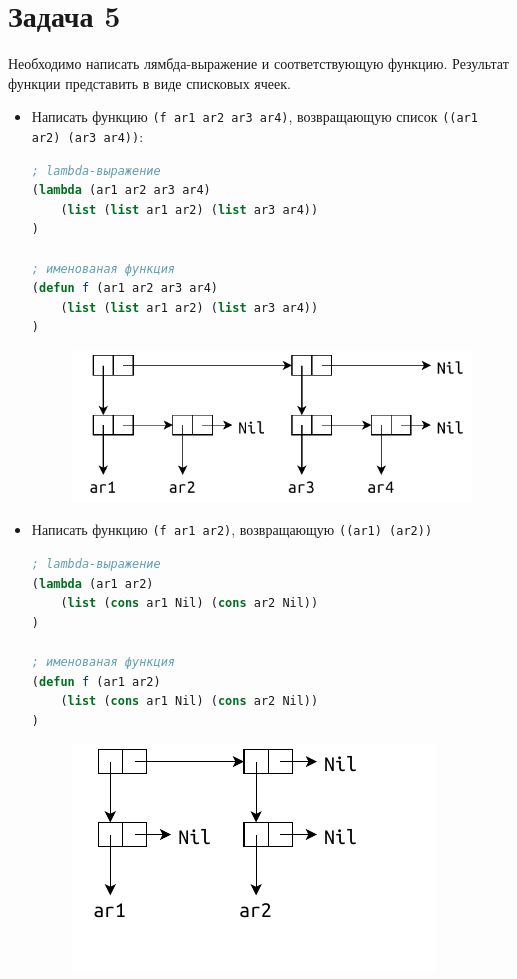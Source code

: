 \section{Задача 5}

Необходимо написать лямбда-выражение и соответствующую функцию. Результат функции представить в виде списковых ячеек.

\begin{itemize}[$\bullet$]
	\item Написать функцию \texttt{(f ar1 ar2 ar3 ar4)}, возвращающую список \texttt{((ar1 ar2) (ar3 ar4))}:
	
\begin{lstlisting}[language=Lisp]
; lambda-выражение
(lambda (ar1 ar2 ar3 ar4)
	(list (list ar1 ar2) (list ar3 ar4))
)

; именованая функция
(defun f (ar1 ar2 ar3 ar4)
	(list (list ar1 ar2) (list ar3 ar4))
)
\end{lstlisting}

	\begin{figure}[ht]
		\centering
		\includegraphics[scale=1]{img/1-7}
	\end{figure}

	\clearpage

	\item Написать функцию \texttt{(f ar1 ar2)}, возвращающую \texttt{((ar1) (ar2))}
	
\begin{lstlisting}[language=Lisp]
; lambda-выражение
(lambda (ar1 ar2)
	(list (cons ar1 Nil) (cons ar2 Nil))
)

; именованая функция
(defun f (ar1 ar2)
	(list (cons ar1 Nil) (cons ar2 Nil))
)
\end{lstlisting}

	\begin{figure}[ht]
		\centering
		\includegraphics[scale=1.2]{img/1-8}
	\end{figure}
		

\end{itemize}

